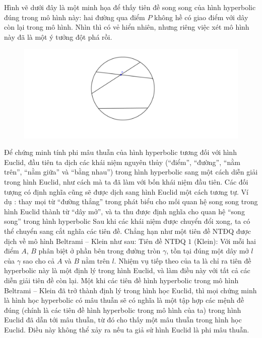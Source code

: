 \begin{multicols}{2}
	Hình vẽ dưới đây là một minh họa để thấy tiên đề song song của hình hyperbolic đúng trong mô hình này: hai đường qua điểm $P$ không hề có giao điểm với dây còn lại trong mô hình. Nhìn thì có vẻ hiển nhiên, nhưng riêng việc xét mô hình này đã là một ý tưởng đột phá rồi. 
	\begin{figure}[H]
		\vspace*{-10pt}
		\centering
		\captionsetup{labelformat= empty, justification=centering}
		\includegraphics[width= 0.8\linewidth]{Hon_mot_duong_song_song.pdf}
		\vspace*{-15pt}
	\end{figure}
	Để chứng minh tính phi mâu thuẫn của hình hyperbolic tương đối với hình Euclid, đầu tiên ta dịch các khái niệm nguyên thủy (``điểm'', ``đường'', ``nằm trên'', ``nằm giữa'' và ``bằng nhau'') trong hình hyperbolic sang một cách diễn giải trong hình Euclid, như cách mà ta đã làm với bốn khái niệm đầu tiên. Các đối tượng có định nghĩa cũng sẽ được dịch sang hình Euclid một cách tương tự. Ví dụ : thay mọi từ ``đường thẳng'' trong phát biểu cho mối quan hệ song song trong hình Euclid thành từ ``dây mở'', và ta thu được định nghĩa cho quan hệ ``song song'' trong hình hyperbolic Sau khi các khái niệm được chuyển đổi xong, ta có thể chuyển sang cắt nghĩa các tiên đề. Chẳng hạn như một tiên đề NTĐQ được dịch về mô hình Beltrami -- Klein như sau:
	\vskip 0.1cm
	Tiên đề NTĐQ $1$ (Klein): Với mỗi hai điểm $A$, $B$ phân biệt ở phần bên trong đường tròn $\gamma$, tồn tại đúng một dây mở $l$ của $\gamma$ sao cho cả $A$ và $B$ nằm trên $l$.
	\vskip 0.1cm
	Nhiệm vụ tiếp theo của ta là chỉ ra tiên đề hyperbolic này là một định lý trong hình Euclid, và làm điều này với tất cả các diễn giải tiên đề còn lại. Một khi các tiên đề hình hyperbolic trong mô hình Beltrami -- Klein đã trở thành định lý trong hình học Euclid, thì mọi chứng minh là hình học hyperbolic có mâu thuẫn sẽ có nghĩa là một tập hợp các mệnh đề đúng (chính là các tiên đề hình hyperbolic trong mô hình của ta) trong hình Euclid đã dẫn tới mâu thuẫn, từ đó cho thấy một mâu thuẫn trong hình học Euclid. Điều này không thể xảy ra nếu ta giả sử hình Euclid là phi mâu thuẫn.

\end{multicols}
